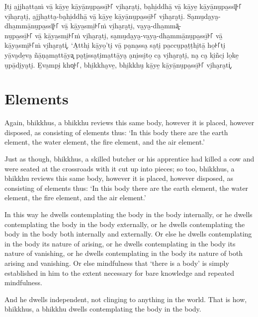I̮ti̮ a̱jjha̱tta̱ṁ vā̱ kā̱ye̱ kā̱yā̱nu̮pa̱ssī̱꜔꜒ vi̮ha̮ra̮ti̮, ba̮hi̱ddhā̱ vā̱ kā̱ye̱ kā̱yā̱nu̮pa̱ssī͓꜔꜒
vi̮ha̮ra̮ti̮, a̱jjha̱tta̮-ba̮hi̱ddhā̱ vā̱ kā̱ye̱ kā̱yā̱nu̮pa̱ssī̱꜔꜒ vi̮ha̮ra̮ti̮. Sa̮mu̮da̮ya̮-dha̱mmā̱nu̮pa̱ssī͓꜔꜒
vā̱ kā̱ya̱smi̱꜔꜒ṁ vi̮ha̮ra̮ti̮, va̮ya̮-dha̱mmā͓-\\
nu̮pa̱ssī̱꜔꜒ vā̱ kā̱ya̱smi̱꜔꜒ṁ vi̮ha̮ra̮ti̮, sa̮mu̮da̮ya̮-va̮ya̮-dha̱mmā̱nu̮pa̱ssī̱꜔꜒ vā̱ kā̱ya̱smi̱꜔꜒ṁ vi̮ha̮ra̮ti͓.
‘A̱tthi̮ kā̱yo̱’ti̮ vā̱ pa̮na̱ssa̮ sa̮ti̮ pa̱ccu̮pa̱ṭṭhi̮tā̱ ho̱꜔꜒ti̮ yā̱va̮de̱va̮ ñā̱ṇa̮ma̱ttā̱ya͓
pa̮ṭi̱ssa̮ti̮ma̱ttā̱ya̮ a̮ni̱ssi̮to̱ ca̮ vi̮ha̮ra̮ti̮, na̮ ca̮ ki̱ñci̮ lo̱ke̱ u̮pā̱di̮ya̮ti̮. E̱va̱mpi̮ kho͓꜔꜒,
bhi̱kkha̮ve̱, bhi̱kkhu̮ kā̱ye̱ kā̱yā̱nu̮pa̱ssī̱꜔꜒ vi̮ha̮ra̮ti͓.


\englishPage
\section{Elements}

Again, bhikkhus, a bhikkhu reviews this same body, however it is placed, however
disposed, as consisting of elements thus: `In this body there are the earth
element, the water element, the fire element, and the air element.'

Just as though, bhikkhus, a skilled butcher or his apprentice had killed a cow
and were seated at the crossroads with it cut up into pieces; so too, bhikkhus,
a bhikkhu reviews this same body, however it is placed, however disposed, as
consisting of elements thus: `In this body there are the earth element, the
water element, the fire element, and the air element.'

In this way he dwells contemplating the body in the body internally, or he
dwells contemplating the body in the body externally, or he dwells contemplating
the body in the body both internally and externally. Or else he dwells
contemplating in the body its nature of arising, or he dwells contemplating in
the body its nature of vanishing, or he dwells contemplating in the body its
nature of both arising and vanishing. Or else mindfulness that ‘there is a body’
is simply established in him to the extent necessary for bare knowledge and
repeated mindfulness.

And he dwells independent, not clinging to anything in the world. That is how,
bhikkhus, a bhikkhu dwells contemplating the body in the body.


